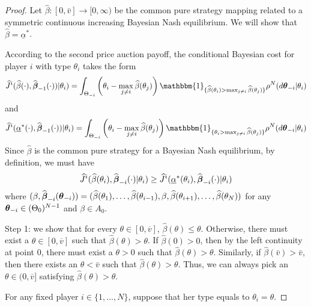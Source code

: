 \begin{proof}
	Let $\hat{\beta} : [0,\bar{v}] \to [0,\infty)$ be the common pure strategy mapping related to a symmetric continuous increasing Bayesian Nash equilibrium. We will show that $\hat{\beta} = \underline{\alpha}^*$.
	
	According to the second price auction payoff, the conditional Bayesian cost for player $i$ with type $\theta_i$ takes the form
	$$
	\hat{J}^i(\hat{\beta}(\cdot), \hat{\bbeta}_{-1}(\cdot) ) | \theta_i) = \int_{\Theta_{-i}} \left(\theta_i - \max_{j\neq i} \hat{\beta}(\theta_j) \right) \mathbbm{1}_{ \{ \hat{\beta}(\theta_i) > \max_{j \neq i} \hat{\beta}(\theta_j)  \} } \rho^N(d\btheta_{-i} | \theta_i)
	$$
	and 
	$$
	\hat{J}^i(\underline{\alpha}^*(\cdot), \hat{\bbeta}_{-1}(\cdot) ) | \theta_i) = \int_{\Theta_{-i}} \left(\theta_i - \max_{j\neq i} \hat{\beta}(\theta_j) \right) \mathbbm{1}_{ \{ \theta_i > \max_{j \neq i} \hat{\beta}(\theta_j)  \} } \rho^N(d\btheta_{-i} | \theta_i)
	$$
	Since $\hat{\beta}$ is the common pure strategy for a Bayesian Nash equilibrium, by definition, we must have
	$$
	\widehat{J}^i(\widehat{\beta}(\theta_i), \widehat{\boldsymbol{\beta}}_{-i}(\cdot) |  \theta_i)  \geq \widehat{J}^i(\underline{\alpha}^*(\theta_i), \widehat{\boldsymbol{\beta}}_{-i}(\cdot) | \theta_i)
	$$
	where $(\beta, \widehat{\boldsymbol{\beta}}_{-i}(\boldsymbol{\theta}_{-i}) ) = (\widehat{\beta}(\theta_1), \ldots, \widehat{\beta}(\theta_{i-1}), \beta, \widehat{\beta}(\theta_{i+1}),  \ldots, \widehat{\beta}(\theta_N))$ for any $\boldsymbol{\theta}_{-i} \in (\Theta_0)^{N-1}$ and $\beta \in A_0$.
	
	
	Step 1:  we show that for every $\theta \in [0, \overline{v}]$, $\hat{\beta}(\theta) \leq \theta$. Otherwise, there must exist a $\theta \in [0, \overline{v}]$ such that $\hat{\beta}(\theta) > \theta$. If $\hat{\beta}(0) > 0$, then by the left continuity at point $0$, there must exist a $\theta > 0$ such that $\hat{\beta}(\theta) > \theta$. Similarly, if $\hat{\beta}(\bar{v}) > \bar{v}$, then there exists an $\theta < \bar{v}$ such that $\hat{\beta}(\theta) > \theta$. Thus, we can always pick an $\theta \in (0, \overline{v}]$ satisfying $\hat{\beta}(\theta) > \theta$.
	
	For any fixed player $i\in \{1,\ldots,N\}$, suppose that her type equals to $\theta_i = \theta$. 


\end{proof}
